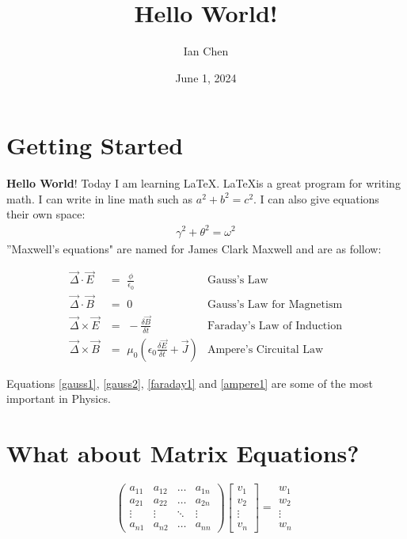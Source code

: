 \documentclass{article}
\title{Hello World!}
\author{Ian Chen}
\date{June 1, 2024}
\begin{document}
\maketitle

\section{Getting Started}
\textbf{Hello World}! Today I am learning \LaTeX. \LaTeX is a great program for writing math. I can write in line math such as $a^2+b^2=c^2$. I can also give equations their own space:
\begin{align}
    \gamma^2+\theta^2=\omega^2
\end{align}
''Maxwell's equations" are named for James Clark Maxwell and are as follow:

\begin{align}
\Vec{\Delta} \cdot \Vec{E} &= \,\,\frac{\phi}{\epsilon_0}  &\text{Gauss's Law} \label{gauss1}\\
\Vec{\Delta} \cdot \Vec{B} &= \,\,0 &\text{Gauss's Law for Magnetism} \label{gauss2}\\
\Vec{\Delta} \times \Vec{E} &= \,\,-\frac{\delta \Vec{B}}{\delta t} &\text{Faraday's Law of Induction} \label{faraday1}\\
\Vec{\Delta} \times \Vec{B} &= \,\,\mu_0 \left(\epsilon_0 \frac{\delta \Vec{E}}{\delta t} + \Vec{J}\right) &\text{Ampere's Circuital Law} \label{ampere1}
\end{align}

Equations \ref{gauss1}, \ref{gauss2}, \ref{faraday1} and \ref{ampere1} are some of the most important in Physics.

\section{What about Matrix Equations?}

\[
\left(
\begin{array}{cccc}
     a_{11} & a_{12} & \dots & a_{1n}\\
     a_{21} & a_{22} & \dots & a_{2n}\\
     \vdots & \vdots & \ddots & \vdots\\
     a_{n1} & a_{n2} & \dots & a_{nn}
\end{array}
\right)
\left[
\begin{array}{c}
     v_1\\
     v_2\\
     \vdots \\
     v_n
\end{array}
\right]
=
\begin{array}{c}
     w_1\\
     w_2\\
     \vdots\\
     w_n
\end{array}
\]
\end{document}
